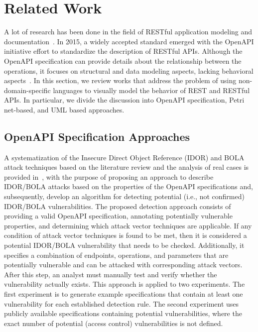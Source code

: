 \section{Related Work}
\label{sec:related_works}


A lot of research has been done in the field of RESTful application modeling and documentation~\cite{ivanchikj2021restalk}. In 2015, a widely accepted standard emerged with the OpenAPI initiative effort to standardize the description of RESTful APIs. Although the OpenAPI specification can provide details about the relationship between the operations, it focuses on structural and data modeling aspects, lacking behavioral aspects~\cite{ivanchikj2021restalk}. In this section, we review works that address the problem of using non-domain-specific languages to visually model the behavior of REST and RESTful APIs. In particular, we divide the discussion into OpenAPI specification, Petri net-based, and UML based approaches.

\subsection{OpenAPI Specification Approaches}

A systematization of the Insecure Direct Object Reference (IDOR) and BOLA attack techniques based on the literature review and the analysis of real cases is provided in~\cite{DBLP:journals/corr/abs-2201-10833}, with the purpose of proposing an approach to describe IDOR/BOLA attacks based on the properties of the OpenAPI specifications and, subsequently, develop an algorithm for detecting potential (i.e., not confirmed) IDOR/BOLA vulnerabilities. The proposed detection approach consists of providing a valid OpenAPI specification, annotating potentially vulnerable properties, and determining which attack vector techniques are applicable.  If any condition of attack vector techniques is found to be met, then it is considered a potential IDOR/BOLA vulnerability that needs to be checked. Additionally, it specifies a combination of endpoints, operations, and parameters that are potentially vulnerable and can be attacked with corresponding attack vectors. After this step, an analyst must manually test and verify whether the vulnerability actually exists. This approach is applied to two experiments. The first experiment is to generate example specifications that contain at least one vulnerability for each established detection rule. The second experiment uses publicly available specifications containing potential vulnerabilities, where the exact number of potential (access control) vulnerabilities is not defined.


